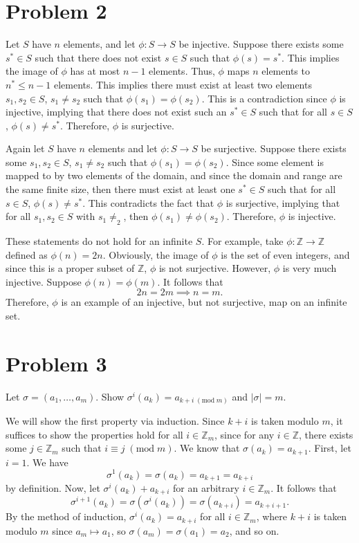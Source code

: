 \documentclass[11pt, letterpaper]{report}
\renewcommand{\mod}[1]{\;(\text{mod}\;#1)}
\begin{document}
\section*{Problem 2}
Let $S$ have $n$ elements, and let $\phi : S\rightarrow S$ be injective. Suppose there exists some $s^*\in S$ such that there does not exist $s\in S$ such that $\phi (s)=s^*$. This implies the image of $\phi $ has at most $n-1$ elements. Thus, $\phi $ maps $n$ elements to $n^*\leq n-1$ elements. This implies there must exist at least two elements $s_1,s_2\in S$, $s_1\neq s_2$ such that $\phi (s_1)=\phi (s_2)$. This is a contradiction since $\phi $ is injective, implying that there does not exist such an $s^*\in S$ such that for all $s\in S$, $\phi (s)\neq s^*$. Therefore, $\phi $ is surjective.

Again let $S$ have $n$ elements and let $\phi : S\rightarrow S$ be surjective. Suppose there exists some $s_1,s_2\in S$, $s_1\neq s_2$ such that $\phi (s_1)=\phi (s_2)$. Since some element is mapped to by two elements of the domain, and since the domain and range are the same finite size, then there must exist at least one $s^*\in S $ such that for all $s\in S$, $\phi (s)\neq s^*$. This contradicts the fact that $\phi $ is surjective, implying that for all $s_1,s_2\in S$ with $s_1 \neq _2$, then $\phi (s_1)\neq \phi (s_2)$. Therefore, $\phi $ is injective.

These statements do not hold for an infinite $S$. For example, take $\phi : \mathbb{Z} \to \mathbb{Z}$ defined as $\phi (n)=2n$. Obviously, the image of $\phi $ is the set of even integers, and since this is a proper subset of  $\mathbb{Z}$, $\phi $ is not surjective. However, $\phi $ is very much injective. Suppose $\phi (n)=\phi (m)$. It follows that
\[
	2n=2m\implies n=m
.\]
Therefore, $\phi $ is an example of an injective, but not surjective, map on an infinite set.
\section*{Problem 3}
Let $\sigma =\left( a_1, \dots, a_m \right) $. Show $\sigma ^i(a_k)=a_{k+i\mod{m}}$ and $\left| \sigma  \right| =m$.

We will show the first property via induction. Since $k+i$ is taken modulo $m$, it suffices to show the properties hold for all $i\in\mathbb{Z}_m$, since for any $i\in\mathbb{Z}$, there exists some $j\in\mathbb{Z}_m$ such that $i\equiv j\mod{m}$. We know that $\sigma (a_k)=a_{k+1}$. First, let $i=1$. We have
\[
	\sigma^1 (a_k)=\sigma (a_k)=a_{k+1}=a_{k+i}
\]
by definition. Now, let $\sigma^i(a_k)+a_{k+i}$ for an arbitrary $i\in\mathbb{Z}_m$. It follows that
\[
	\sigma ^{i+1}(a_{k})=\sigma (\sigma ^i(a_k))=\sigma (a_{k+i})=a_{k+i+1}
.\]
By the method of induction, $\sigma^i(a_k)=a_{k+i}$ for all $i\in\mathbb{Z}_m$, where $k+i$ is taken modulo $m$ since $a_m\mapsto a_1$, so $\sigma (a_{m})=\sigma (a_1)=a_2$, and so on.
\end{document}
